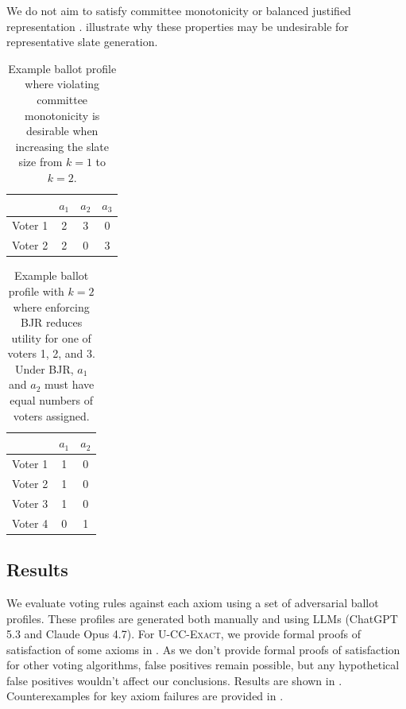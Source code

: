 \documentclass[letterpaper]{article} %
\newcommand{\Exact}{\textsc{U-CC-Exact}}
\begin{document}
We do not aim to satisfy committee monotonicity \citep{elkind-committee-monotonicity} or balanced justified representation \citep{fish-v2}.
 illustrate why these properties may be undesirable for representative slate generation.

\begin{table}[t]
\centering
\begin{tabular}{l|ccc}
\hline
 & $a_1$ & $a_2$ & $a_3$ \\
\hline
Voter 1 & 2 & 3 & 0 \\
Voter 2 & 2 & 0 & 3 \\
\hline
\end{tabular}
\caption{Example ballot profile where violating committee monotonicity is desirable when increasing the slate size from \(k=1\) to \(k=2\).}
\label{tab:committee-monotonicity-example}
\end{table}

\begin{table}[t]
\centering
\begin{tabular}{l|cc}
\hline
 & $a_1$ & $a_2$ \\
\hline
Voter 1 & 1 & 0 \\
Voter 2 & 1 & 0 \\
Voter 3 & 1 & 0 \\
Voter 4 & 0 & 1 \\
\hline
\end{tabular}
\caption{Example ballot profile with \(k=2\) where enforcing BJR reduces utility for one of voters 1, 2, and 3.
Under BJR, \(a_1\) and \(a_2\) must have equal numbers of voters assigned.}
\label{tab:bjr-example}
\end{table}

\subsection{Results}
\label{app:axiom-results}

We evaluate voting rules against each axiom using a set of adversarial ballot profiles.
These profiles are generated both manually and using LLMs (ChatGPT 5.3 and Claude Opus 4.7).
For \Exact{}, we provide formal proofs of satisfaction of some axioms in .
As we don't provide formal proofs of satisfaction for other voting algorithms, false positives remain possible, but any hypothetical false positives wouldn't affect our conclusions.
Results are shown in . %
Counterexamples for key axiom failures are provided in .
\end{document}
